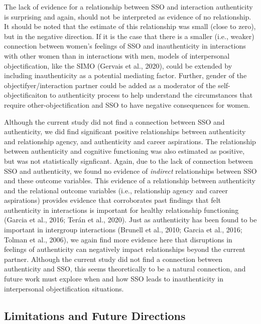 \documentclass[man]{apa6}
\begin{document}
The lack of evidence for a relationship between SSO and interaction
authenticity is surprising and again, should not be interpreted as
evidence of no relationship. It should be noted that the estimate of
this relationship was small (close to zero), but in the negative
direction. If it is the case that there is a smaller (i.e., weaker)
connection between women's feelings of SSO and inauthenticity in
interactions with other women than in interactions with men, models of
interpersonal objectification, like the SIMO (Gervais et al., 2020),
could be extended by including inauthenticity as a potential mediating
factor. Further, gender of the objectifyer/interaction partner could be
added as a moderator of the self-objectificaiton to authenticity process
to help understand the circumstances that require other-objectification
and SSO to have negative consequences for women.

Although the current study did not find a connection between SSO and
authenticity, we did find significant positive relationships between
authenticity and relationship agency, and authenticity and career
aspirations. The relationship between authenticity and cognitive
functioning was also estimated as positive, but was not statistically
signficant. Again, due to the lack of connection between SSO and
authenticity, we found no evidence of \emph{indirect} relationships
between SSO and these outcome variables. This evidence of a relationship
between authenticity and the relational outcome variables (i.e.,
relationship agency and career aspirations) provides evidence that
corroborates past findings that felt authenticity in interactions is
important for healthy relationship functioning (Garcia et al., 2016;
Terán et al., 2020). Just as authenticity has been found to be important
in intergroup interactions (Brunell et al., 2010; Garcia et al., 2016;
Tolman et al., 2006), we again find more evidence here that disruptions
in feelings of authenticity can negatively impact relationships beyond
the current partner. Although the current study did not find a
connection between authenticity and SSO, this seems theoretically to be
a natural connection, and future work must explore when and how SSO
leads to inauthenticity in interpersonal objectification situations.

\subsection{Limitations and Future
Directions}\label{limitations-and-future-directions}
\end{document}
